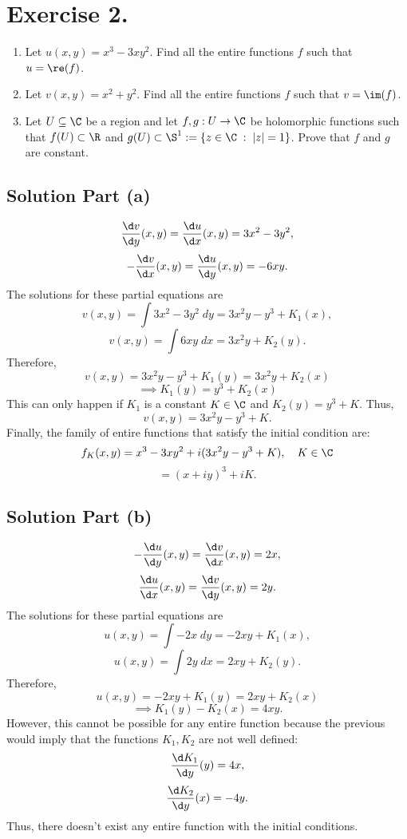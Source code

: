 \section*{Exercise 2.}

\begin{enumerate}[label=(\alph*)]
    \item Let $u(x,y) = x^3-3xy^2$. Find all the entire functions $f$ such that $u = \re(f)$.
    \item Let $v(x,y) = x^2 + y^2$. Find all the entire functions $f$ such that $v = \im(f)$.
    \item Let $U\subseteq \C$ be a region and let $f,g : U \to \C$ be holomorphic functions such that $f(U) \subset \R$ and $g(U) \subset \S^1 := \{z \in\C \;:\; |z| = 1\}$. Prove that $f$ and $g$ are constant. 
\end{enumerate}

\subsection*{Solution Part (a)}

\[ \frac{\d v}{\d y}(x,y) = \frac{\d u}{\d x}(x,y) = 3x^2-3y^2, \]
\[ -\frac{\d v}{\d x}(x,y) = \frac{\d u}{\d y}(x,y) = -6xy. \]
The solutions for these partial equations are
\[ v(x,y) = \int 3x^2-3y^2\; dy = 3x^2y-y^3 + K_1(x),\]
\[ v(x,y) = \int 6xy\; dx = 3x^2 y + K_2(y). \]
Therefore,
\[ v(x,y) = 3x^2y-y^3 + K_1(y) = 3x^2 y + K_2(x) \]
\[ \implies K_1(y) = y^3 + K_2(x) \]
This can only happen if $K_1$ is a constant $K \in \C$ and $K_2(y) = y^3 + K$. Thus,
\[ v(x,y) = 3x^2 y - y^3 + K. \]
Finally, the family of entire functions that satisfy the initial condition are:
\[ f_K(x,y) = x^3-3xy^2 + i(3x^2 y - y^3 + K),\hspace{1em} K\in \C \]
\[ = (x+iy)^3 + iK. \]

\subsection*{Solution Part (b)}

\[ -\frac{\d u}{\d y}(x,y) = \frac{\d v}{\d x}(x,y) = 2x, \]
\[ \frac{\d u}{\d x}(x,y) = \frac{\d v}{\d y}(x,y) = 2y. \]
The solutions for these partial equations are
\[ u(x,y) = \int -2x\; dy = -2xy + K_1(x),\]
\[ u(x,y) = \int 2y\; dx = 2xy + K_2(y). \]
Therefore,
\[ u(x,y) = -2xy + K_1(y) = 2xy + K_2(x) \]
\[ \implies K_1(y)-K_2(x) = 4xy. \]
However, this cannot be possible for any entire 
function because the previous would imply that the functions $K_1,K_2$ are not well defined:
\[ \frac{\d K_1}{\d y}(y) = 4x, \]
\[ \frac{\d K_2}{\d y}(x) = -4y. \]
Thus, there doesn't exist any entire function with the initial conditions.

